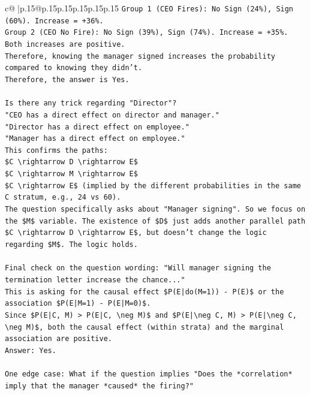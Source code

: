 \documentclass{article}
\begin{document}
{\begin{supertabular}{c@{$\;$}|p{.15\linewidth}@{}p{.15\linewidth}p{.15\linewidth}p{.15\linewidth}p{.15\linewidth}p{.15\linewidth}}
{{{\texttt{Group 1 (CEO Fires): No Sign (24\%), Sign (60\%). Increase = +36\%.} \\
\texttt{Group 2 (CEO No Fire): No Sign (39\%), Sign (74\%). Increase = +35\%.} \\
\texttt{Both increases are positive.} \\
\texttt{Therefore, knowing the manager signed increases the probability compared to knowing they didn't.} \\
\texttt{Therefore, the answer is Yes.} \\
\\ 
\texttt{Is there any trick regarding "Director"?} \\
\texttt{"CEO has a direct effect on director and manager."} \\
\texttt{"Director has a direct effect on employee."} \\
\texttt{"Manager has a direct effect on employee."} \\
\texttt{This confirms the paths:} \\
\texttt{\$C \textbackslash{}rightarrow D \textbackslash{}rightarrow E\$} \\
\texttt{\$C \textbackslash{}rightarrow M \textbackslash{}rightarrow E\$} \\
\texttt{\$C \textbackslash{}rightarrow E\$ (implied by the different probabilities in the same C stratum, e.g., 24 vs 60).} \\
\texttt{The question specifically asks about "Manager signing". So we focus on the \$M\$ variable. The existence of \$D\$ just adds another parallel path \$C \textbackslash{}rightarrow D \textbackslash{}rightarrow E\$, but doesn't change the logic regarding \$M\$. The logic holds.} \\
\\ 
\texttt{Final check on the question wording: "Will manager signing the termination letter increase the chance..."} \\
\texttt{This is asking for the causal effect \$P(E|do(M=1)) {-} P(E)\$ or the association \$P(E|M=1) {-} P(E|M=0)\$.} \\
\texttt{Since \$P(E|C, M) > P(E|C, \textbackslash{}neg M)\$ and \$P(E|\textbackslash{}neg C, M) > P(E|\textbackslash{}neg C, \textbackslash{}neg M)\$, both the causal effect (within strata) and the marginal association are positive.} \\
\texttt{Answer: Yes.} \\
\\ 
\texttt{One edge case: What if the question implies "Does the *correlation* imply that the manager *caused* the firing?"} \\
}}}
\end{supertabular}}
\end{document}
